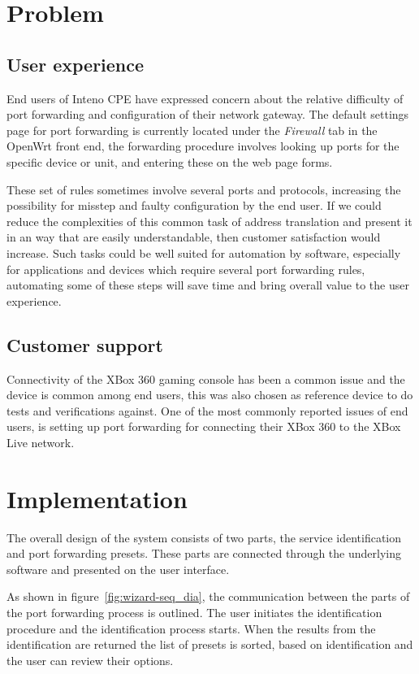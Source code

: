 \documentclass[a4paper,11pt,makeidx]{kth-bcs}
\begin{document}
\chapter{Problem}
   \section{User experience}
End users of Inteno CPE have expressed concern about the relative difficulty of port forwarding and configuration of their network gateway.
The default settings page for port forwarding is currently located under the \emph{Firewall} tab in the OpenWrt front end, the forwarding procedure involves looking up ports for the specific device or unit, and entering these on the web page forms.

These set of rules sometimes involve several ports and protocols, increasing the possibility for misstep and faulty configuration by the end user.
If we could reduce the complexities of this common task of address translation and present it in an way that are easily understandable, then customer satisfaction would increase.
Such tasks could be well suited for automation by software, especially for applications and devices which require several port forwarding rules, automating some of these steps will save time and bring overall value to the user experience.


   \section{Customer support}
Connectivity of the XBox 360 gaming console has been a common issue and the device is common among end users, this was also chosen as reference device to do tests and verifications against.
One of the most commonly reported issues of end users, is setting up port forwarding for connecting their XBox 360 to the XBox Live network.

\chapter{Implementation}
The overall design of the system consists of two parts, the service identification and port forwarding presets.
These parts are connected through the underlying software and presented on the user interface.

As shown in figure~\ref{fig:wizard-seq_dia}, the communication between the parts of the port forwarding process is outlined.
The user initiates the identification procedure and the identification process starts.
When the results from the identification are returned the list of presets is sorted, based on identification and the user can review their options.
\end{document}
